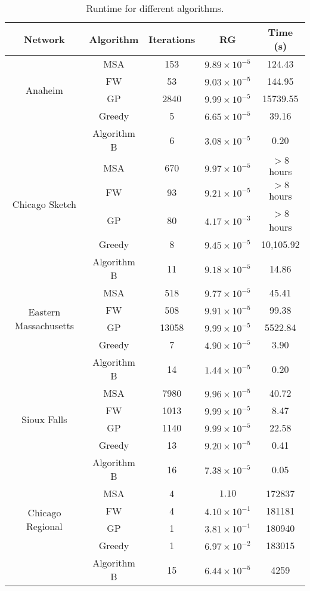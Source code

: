 \begin{table}
\caption{Runtime for different algorithms.}
\label{table:resulttable}
\center
\begin{tabular}{|c|c|c|c|c|}
\hline
Network	&	Algorithm	&	Iterations	&	RG	& Time (s)\\
\hline
\multirow{4}{*}{Anaheim}
	&	MSA	&	153	&	$9.89\times 10^{-5}$	&	124.43\\
	&	FW	&	53	&	$9.03\times 10^{-5}$	&	144.95\\
	&	GP	&	2840	&	$9.99\times 10^{-5}$	&	15739.55\\
	&	Greedy	&	5	&	$6.65\times 10^{-5}$	&	39.16\\
	&	Algorithm B	& 6	&	$3.08\times 10^{-5}$	&	0.20\\	
	\hline
\multirow{4}{*}{Chicago Sketch}
	&	MSA		&	670	&	$9.97\times 10^{-5}$	&	$>8$ hours\\
	&	FW		&	93	&	$9.21\times 10^{-5}$	&	$>8$ hours\\
	&	GP		&	80	&	$4.17\times 10^{-3}$	&	$>$8 hours\\
	&	Greedy  &	8	&	$9.45\times 10^{-5}$	&	10,105.92\\
	&	Algorithm B	&	11	&	$9.18\times 10^{-5}$	&	14.86\\
	\hline
\multirow{4}{*}{Eastern Massachusetts}
	&	MSA		&	518	&	$9.77\times 10^{-5}$	&	45.41\\
	&	FW		&	508	&	$9.91\times 10^{-5}$	&	99.38\\
	&	GP		&	13058	&	$9.99\times 10^{-5}$	&	5522.84\\
	&	Greedy	&	7		&	$4.90\times 10^{-5}$	&	3.90\\
	&	Algorithm B & 14	&	$1.44\times 10^{-5}$	&	0.20\\
	\hline
\multirow{4}{*}{Sioux Falls}
	&	MSA		&	7980	&	$9.96\times 10^{-5}$	&	40.72\\
	&	FW		&	1013	&	$9.99\times 10^{-5}$	&	8.47\\
	&	GP		&	1140	&	$9.99\times 10^{-5}$	&	22.58\\
	&	Greedy	&	13		&	$9.20\times 10^{-5}$	&	0.41\\
	&	Algorithm B	&	16	&	$7.38\times 10^{-5}$	&	0.05\\
\hline
\multirow{4}{*}{Chicago Regional}
	& MSA	&	4	&	$1.10$	&	172837\\
	& FW	&	4	&	$4.10\times 10^{-1}$	&	181181\\
	& GP	&	1	&	$3.81\times 10^{-1}$	&	180940\\
	& Greedy	&	1	&	$6.97\times 10^{-2}$	&	183015\\
	& Algorithm B	&	15	&	$6.44\times 10^{-5}$	&	4259\\
\hline
\end{tabular}
\end{table}
